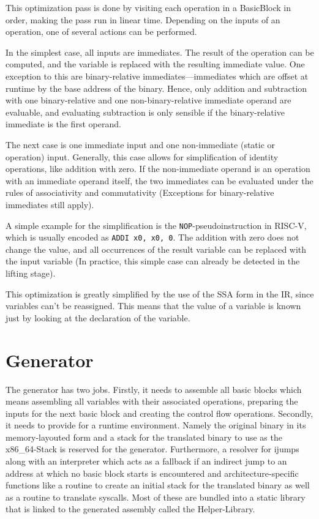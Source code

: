 \documentclass[course=eragp]{aspdoc}
\begin{document}
This optimization pass is done by visiting each operation in a BasicBlock in order, making the pass run in linear time.
Depending on the inputs of an operation, one of several actions can be performed.

In the simplest case, all inputs are immediates. The result of the operation can be computed, and the variable is
replaced with the resulting immediate value. One exception to this are binary-relative immediates---immediates which are
offset at runtime by the base address of the binary. Hence, only addition and subtraction with one binary-relative and
one non-binary-relative immediate operand are evaluable, and evaluating subtraction is only sensible if the
binary-relative immediate is the first operand.

The next case is one immediate input and one non-immediate (static or operation) input. Generally, this case allows for
simplification of identity operations, like addition with zero. If the non-immediate operand is an operation with an
immediate operand itself, the two immediates can be evaluated under the rules of associativity and commutativity
(Exceptions for binary-relative immediates still apply).

A simple example for the simplification is the \texttt{NOP}-pseudoinstruction in RISC-V, which is usually encoded as
\texttt{ADDI x0, x0, 0}.\cite[p.~20]{rvspec} The addition with zero does not change the value, and all occurrences of
the result variable can be replaced with the input variable (In practice, this simple case can already be detected in
the lifting stage).

This optimization is greatly simplified by the use of the SSA form in the IR, since variables can't be
reassigned. This means that the value of a variable is known just by looking at the declaration of the variable.


\section{Generator}\label{generator}
The generator has two jobs. %
Firstly, it needs to assemble all basic blocks which means assembling all variables with their associated operations,
preparing the inputs for the next basic block and creating the control flow operations.
Secondly, it needs to provide for a runtime environment. Namely the original binary in its memory-layouted
form and a stack for the translated binary to use as the x86\_64-Stack is reserved for the
generator. Furthermore, a resolver for ijumps
along with an interpreter which acts as a fallback if an indirect jump to an address at which no basic block starts is encountered
and architecture-specific functions like a routine to create an initial stack for the translated binary as well as a routine to translate syscalls.
Most of these are bundled into a static library that is linked to the generated assembly called the
Helper-Library.
\end{document}
